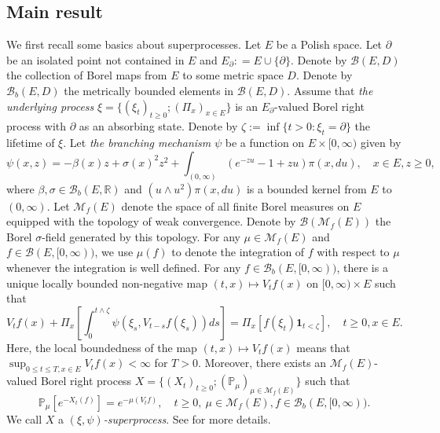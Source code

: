\documentclass[12pt,a4paper]{amsart}
\numberwithin{equation}{section}
\theoremstyle{plain}
\theoremstyle{definition}
\theoremstyle{remark}
\begin{document}
\subsection{Main result} \label{sec:super}

	We first recall some basics about superprocesses.
	Let $E$ be a Polish space.
    Let $\partial$ be an isolated point not contained in $E$ and $E_\partial: = E \cup \{\partial\}$.
	Denote by $\mathcal B(E, D)$ the collection of Borel maps  from $E$ to some metric space $D$.
    Denote by $\mathcal B_b(E,D)$ the metrically bounded elements in $\mathcal B(E,D)$.
	Assume that \emph{the underlying process} $\xi = \{(\xi_t)_{t\ge0}; (\Pi_x)_{x\in E}\}$ is an $E_\partial$-valued Borel right process with $\partial$ as an absorbing state.
	Denote by $\zeta:=\inf\{t>0: \xi_t=\partial\}$ the lifetime of $\xi$.
	Let \emph{the branching mechanism} $\psi$ be a function on $E \times [0,\infty)$ given by
\begin{equation}
	\psi(x,z)
	= -\beta(x) z + \sigma(x)^2 z^2 + \int_{(0,\infty)} (e^{-zu} -1 + zu) \pi(x,du),
	\quad x\in E, z\geq 0,
\end{equation}
	where $\beta, \sigma \in \mathcal B_b(E,\mathbb R)$ and $(u \wedge u^2) \pi(x,du)$ is a bounded kernel from $E$ to $(0,\infty)$.
	Let $\mathcal M_f(E)$ denote the space of all finite Borel measures on $E$ equipped with the topology of weak convergence.
	Denote by $\mathcal B(\mathcal M_f(E))$ the Borel $\sigma$-field generated by this topology.
	For any $\mu\in\mathcal M_f(E)$ and $f \in \mathcal B(E, [0,\infty))$, we use $\mu(f)$ to denote the integration of $f$ with respect to $\mu$ whenever the integration is well defined.
	For any $f \in \mathcal B_b(E, [0,\infty))$, there is a unique locally bounded non-negative map $(t,x)\mapsto V_tf(x)$ on $[0,\infty) \times E$ such that
\begin{equation} \label{eq:BGD.1}
	V_tf(x) + \Pi_x \left[ \int_0^{t\wedge \zeta} \psi \left(\xi_s, V_{t-s}f(\xi_s)\right) ds\right]
	= \Pi_x\left[ f(\xi_t)  \mathbf 1_{t < \zeta}\right], \quad t\geq 0, x\in E.
\end{equation}
	Here, the local boundedness of the map $(t,x) \mapsto V_tf(x)$ means that $\sup_{0\leq t\leq T, x\in E} V_tf(x)< \infty$ for $T >0$.
	Moreover, there exists an $\mathcal M_f(E)$-valued Borel right process $X =\{(X_t)_{t\geq 0}; (\mathbb P_\mu)_{\mu \in \mathcal M_f(E)}\}$ such that
\begin{equation}
	\mathbb P_\mu[e^{- X_t(f)}]
	= e^{- \mu(V_tf)},
	\quad t\geq 0,~\mu \in \mathcal M_f(E), f \in \mathcal B_b(E,[0,\infty)).
\end{equation}
	We call $X$ a \emph{$(\xi, \psi)$-superprocess}.
	See \cite{Li2011MeasureValued} for more details.
\end{document}
